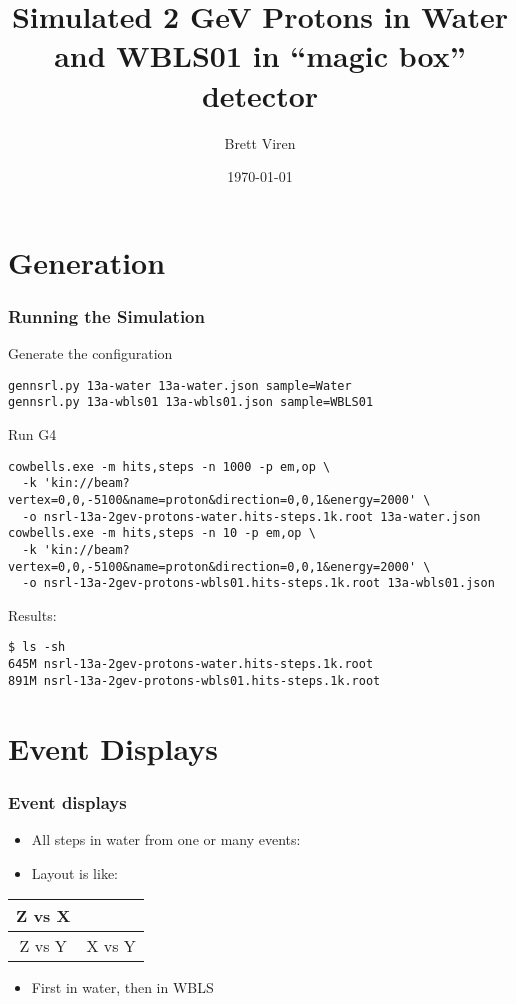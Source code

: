 \documentclass[xcolor=dvipsnames]{beamer}
\begin{document}
\title{Simulated 2 GeV Protons in Water and WBLS01 in ``magic box'' detector}
\author{Brett Viren}
\date{\today}
\frame{\titlepage}

\section{Generation}
\label{sec:gen}

\begin{frame}[fragile]
  \frametitle{Running the Simulation}
  Generate the configuration
{\footnotesize
\begin{verbatim}
gennsrl.py 13a-water 13a-water.json sample=Water
gennsrl.py 13a-wbls01 13a-wbls01.json sample=WBLS01
\end{verbatim}
}

  Run G4

{\tiny
\begin{verbatim}
cowbells.exe -m hits,steps -n 1000 -p em,op \
  -k 'kin://beam?vertex=0,0,-5100&name=proton&direction=0,0,1&energy=2000' \
  -o nsrl-13a-2gev-protons-water.hits-steps.1k.root 13a-water.json 
cowbells.exe -m hits,steps -n 10 -p em,op \
  -k 'kin://beam?vertex=0,0,-5100&name=proton&direction=0,0,1&energy=2000' \
  -o nsrl-13a-2gev-protons-wbls01.hits-steps.1k.root 13a-wbls01.json
\end{verbatim}
}

 Results:
{\footnotesize
\begin{verbatim}
$ ls -sh
645M nsrl-13a-2gev-protons-water.hits-steps.1k.root
891M nsrl-13a-2gev-protons-wbls01.hits-steps.1k.root
\end{verbatim}
}
\end{frame}

\section{Event Displays}

\begin{frame}[fragile]
  \frametitle{Event displays}
  \begin{itemize}
  \item   All steps in water from one or many events:
  \item Layout is like:
  \end{itemize}

  \begin{center}
  \begin{tabular}[h]{|c|c|}
    \hline
    Z vs X & \\
    \hline
    Z vs Y & X vs Y \\
    \hline
  \end{tabular}
  \end{center}
  \begin{itemize}
  \item First in water, then in WBLS
  \end{itemize}

\end{frame}
\end{document}
